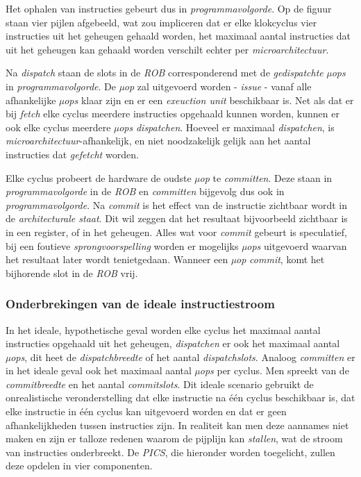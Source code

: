 \documentclass[12pt,a4paper,faculty=ea,language=nl]{ugent-doc}
\begin{document}
Het ophalen van instructies gebeurt dus in \textit{programmavolgorde}. Op de figuur staan vier pijlen afgebeeld, wat zou impliceren dat er elke klokcyclus vier instructies uit het geheugen gehaald worden, het maximaal aantal instructies dat uit het geheugen kan gehaald worden verschilt echter per \textit{microarchitectuur}.

Na \textit{dispatch} staan de slots in de \textit{ROB} corresponderend met de \textit{gedispatchte} \textit{µops} in \textit{programmavolgorde}. De \textit{µop} zal uitgevoerd worden - \textit{issue} - vanaf alle afhankelijke \textit{µops} klaar zijn en er een \textit{exeuction unit} beschikbaar is. Net als dat er bij \textit{fetch} elke cyclus meerdere instructies opgehaald kunnen worden, kunnen er ook elke cyclus meerdere \textit{µops} \textit{dispatchen}. Hoeveel er maximaal \textit{dispatchen}, is \textit{microarchitectuur}-afhankelijk, en niet noodzakelijk gelijk aan het aantal instructies dat \textit{gefetcht} worden.

Elke cyclus probeert de hardware de oudste \textit{µop} te \textit{committen}. Deze staan in \textit{programmavolgorde} in de \textit{ROB} en \textit{committen} bijgevolg dus ook in \textit{programmavolgorde}. Na \textit{commit} is het effect van de instructie zichtbaar wordt in de \textit{architecturale staat}. Dit wil zeggen dat het resultaat bijvoorbeeld zichtbaar is in een register, of in het geheugen. Alles wat voor \textit{commit} gebeurt is speculatief, bij een foutieve \textit{sprongvoorspelling} worden er mogelijks \textit{µops} uitgevoerd waarvan het resultaat later wordt tenietgedaan. Wanneer een \textit{µop} \textit{commit}, komt het bijhorende slot in de \textit{ROB} vrij.

\subsubsection{Onderbrekingen van de ideale instructiestroom}
In het ideale, hypothetische geval worden elke cyclus het maximaal aantal instructies opgehaald uit het geheugen, \textit{dispatchen} er ook het maximaal aantal \textit{µops}, dit heet de \textit{dispatchbreedte} of het aantal \textit{dispatchslots}. Analoog \textit{committen} er in het ideale geval ook het maximaal aantal \textit{µops} per cyclus. Men spreekt van de \textit{commitbreedte} en het aantal \textit{commitslots}. Dit ideale scenario gebruikt de onrealistische veronderstelling dat elke instructie na één cyclus beschikbaar is, dat elke instructie in één cyclus kan uitgevoerd worden en dat er geen afhankelijkheden tussen instructies zijn. In realiteit kan men deze aannames niet maken en zijn er talloze redenen waarom de pijplijn kan \textit{stallen}, wat de stroom van instructies onderbreekt. De \textit{PICS}, die hieronder worden toegelicht, zullen deze opdelen in vier componenten.
\end{document}
